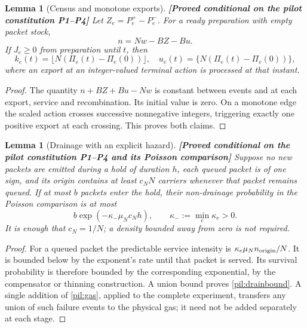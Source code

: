 \documentclass[11pt,a4paper]{article}
\newtheorem{lemma}[theorem]{Lemma}
\theoremstyle{definition}
\theoremstyle{remark}\newtheorem{remark}[theorem]{Remark}
\newcommand{\status}[1]{\textbf{[#1]}\quad}
\begin{document}
\begin{lemma}[Census and monotone exports]\label{pil:census}
\status{Proved conditional on the pilot constitution P1--P4}
Let $Z_e=P_e^+-P_e^-$. For a ready preparation with empty packet stock,
\begin{equation}\label{pil:censusformula}
 n=Nw-BZ-Bu.
\end{equation}
If $J_e\ge0$ from preparation until $t$, then
\begin{equation}\label{pil:floor}
 k_e(t)=\lfloor N(\Pi_e(t)-\Pi_e(0))\rfloor,
 \quad u_e(t)=\{N(\Pi_e(t)-\Pi_e(0))\},
\end{equation}
where an export at an integer-valued terminal action is processed at that instant.
\end{lemma}
\begin{proof}
The quantity $n+BZ+Bu-Nw$ is constant between events and at each export, service and recombination. Its initial value is zero. On a monotone edge the scaled action crosses successive nonnegative integers, triggering exactly one positive export at each crossing. This proves both claims.
\end{proof}

\begin{lemma}[Drainage with an explicit hazard]\label{pil:drain}
\status{Proved conditional on the pilot constitution P1--P4 and its Poisson comparison}
Suppose no new packets are emitted during a hold of duration $h$, each queued packet is of one sign, and its origin contains at least $c_NN$ carriers whenever that packet remains queued. If at most $b$ packets enter the hold, their non-drainage probability in the Poisson comparison is at most
\begin{equation}\label{pil:drainbound}
 b\exp(-\kappa_-\mu_Nc_N h),\qquad \kappa_-:=\min_e\kappa_e>0.
\end{equation}
It is enough that $c_N=1/N$; a density bounded away from zero is not required.
\end{lemma}
\begin{proof}
For a queued packet the predictable service intensity is $\kappa_e\mu_N n_{\rm origin}/N$. It is bounded below by the exponent's rate until that packet is served. Its survival probability is therefore bounded by the corresponding exponential, by the compensator or thinning construction. A union bound proves \eqref{pil:drainbound}. A single addition of \eqref{pil:gas}, applied to the complete experiment, transfers any union of such failure events to the physical gas; it need not be added separately at each stage.
\end{proof}
\end{document}
